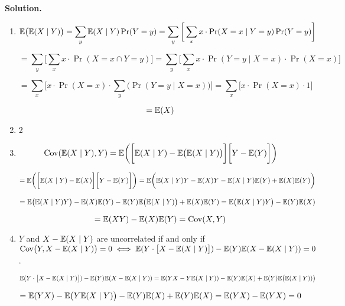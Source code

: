 \textbf{Solution.} \begin{enumerate}[(1)]

\item 

\[
\E\big(\E(X\mid Y)\big) = \sum_y \E(X \mid Y) \Pr(Y = y) = \sum_y \bigg[ \sum_x x \cdot \Pr(X = x \mid Y = y) \Pr(Y = y) \bigg]
\]

\[
= \sum_y \bigg[ \sum_x x \cdot \Pr(X = x \cap Y = y) \bigg] = \sum_y \bigg[ \sum_x x \cdot \Pr(Y= y \mid X = x) \cdot \Pr(X = x) \bigg]
\]

\[
= \sum_x \bigg[ x \cdot \Pr(X = x) \cdot \sum_y \big( \Pr(Y= y \mid X = x) \big) \bigg] = \sum_x \bigg[ x \cdot \Pr(X = x) \cdot 1 \bigg]
\]

\[
= \E(X)
\]

\item 2
%
%
%
%
%
%

\item 

\[
\Cov(\E(X \mid Y) , Y) = \E \bigg( \bigg[\E(X \mid Y) - \E \big(\E(X \mid Y) \big) \bigg] \bigg[Y - \E(Y) \bigg] \bigg)
\]

\[
= \E \bigg( \bigg[\E(X \mid Y) - \E (X) \bigg] \bigg[Y - \E(Y) \bigg] \bigg) = \E \bigg( \E(X \mid Y)Y  - \E (X) Y -  \E(X \mid Y)\E(Y) +  \E(X)\E(Y)  \bigg)
\]

\[
= \E \big( \E(X \mid Y)Y\big)  -  \E (X) \E( Y)  - \E(Y) \E \big( \E(X \mid Y) \big) +   \E(X)\E(Y) = \E \big( \E(X \mid Y)Y\big)  - \E(Y) \E(X)
\]

\[
= \E(XY) - \E(X) \E(Y) = \Cov(X, Y)
\]

\item \(Y\) and \(X  - \E(X \mid Y)\) are uncorrelated if and only if \( \Cov \big(Y, X - \E(X \mid Y) \big) = 0 \iff \E(Y \cdot \big[ X - \E(X \mid Y)\big] ) - \E(Y) \E( X - \E(X \mid Y)) = 0 \).

\[
\E(Y \cdot \big[ X - \E(X \mid Y)\big] ) -  \E(Y) \E( X - \E(X \mid Y))= \E(Y X - Y \E(X \mid Y) ) -  \E(Y) \E( X) +  \E(Y) \E \big( \E(X \mid Y)) \big)
\]

\[
= \E(Y X) - \E\big( Y \E(X \mid Y) \big) -  \E(Y) \E( X)  + \E(Y) \E(X) = \E(YX) - \E(YX) = 0
\]

\end{enumerate}


